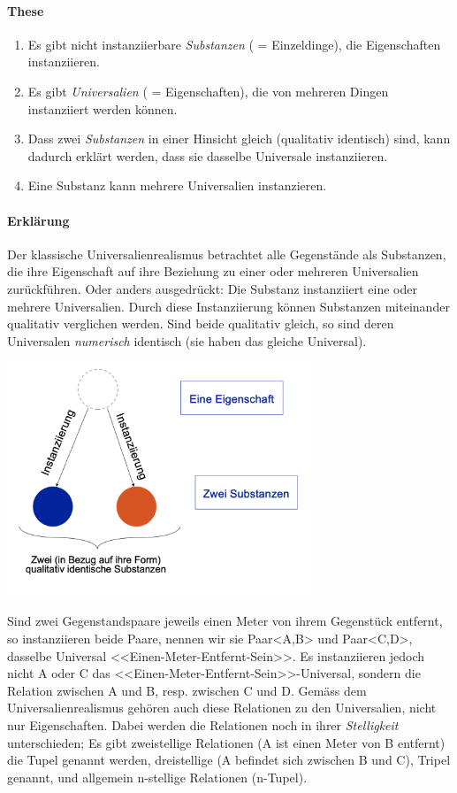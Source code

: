 \documentclass[../main.tex]{subfiles}
\begin{document}
\paragraph{These} 
\begin{enumerate}[label=(\alph*)]
	\item Es gibt nicht instanziierbare \textit{Substanzen} ( = Einzeldinge), die Eigenschaften instanziieren.
	\item Es gibt \textit{Universalien} ( = Eigenschaften), die von mehreren Dingen instanziiert werden können. 
	\item Dass zwei \textit{Substanzen} in einer Hinsicht gleich (qualitativ identisch) sind, kann dadurch erklärt werden, dass sie dasselbe Universale instanziieren. 
	\item Eine Substanz kann mehrere Universalien instanzieren.
\end{enumerate} 
\paragraph{Erklärung} Der klassische Universalienrealismus betrachtet alle Gegenstände als Substanzen, die ihre Eigenschaft auf ihre Beziehung zu einer oder mehreren Universalien zurückführen. Oder anders ausgedrückt: Die Substanz instanziiert eine oder mehrere Universalien. Durch diese Instanziierung können Substanzen miteinander qualitativ verglichen werden. Sind beide qualitativ gleich, so sind deren Universalen \textit{numerisch} identisch (sie haben das gleiche Universal).

{\centering\includegraphics[height=7cm]{images/eine_eigenschaft_zwei_substanzen_universalienrealismus.png}\endcenter}

Sind zwei Gegenstandspaare jeweils einen Meter von ihrem Gegenstück entfernt, so instanziieren beide Paare, nennen wir sie Paar<A,B> und Paar<C,D>, dasselbe Universal <<Einen-Meter-Entfernt-Sein>>. Es instanziieren jedoch nicht A oder C das <<Einen-Meter-Entfernt-Sein>>-Universal, sondern die Relation zwischen A und B, resp. zwischen C und D. Gemäss dem Universalienrealismus gehören auch diese Relationen zu den Universalien, nicht nur Eigenschaften. Dabei werden die Relationen noch in ihrer \textit{Stelligkeit} unterschieden; Es gibt zweistellige Relationen (A ist einen Meter von B entfernt) die Tupel genannt werden, dreistellige (A befindet sich zwischen B und C), Tripel genannt, und allgemein n-stellige Relationen (n-Tupel).
\end{document}

